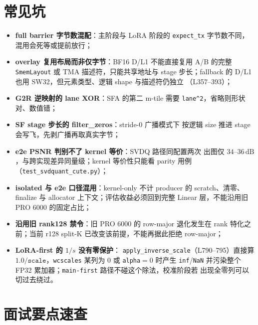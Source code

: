 \section{常见坑}

\begin{itemize}[itemsep=1pt,topsep=2pt]
  \item \textbf{full barrier 字节数混配}：主阶段与 LoRA 阶段的
        \texttt{expect\_tx} 字节数不同，混用会死等或提前放行；
  \item \textbf{overlay 复用布局而非仅字节}：BF16 D/L1 不能直接复用
        A/B 的完整 \texttt{SmemLayout} 或 TMA 描述符，只能共享地址与 stage
        步长；fallback 的 D/L1 也用 SW32，但元素类型、逻辑 shape 与描述符仍独立
        （L357--393）；
  \item \textbf{G2R 逆映射的 lane XOR}：SFA 的第二 m-tile 需要
        \texttt{lane\^{}2}，省略则形状对、数值错；
  \item \textbf{SF stage 步长的 filter\_zeros}：stride-0 广播模式下
        按逻辑 size 推进 stage 会写飞，先剥广播再取真实字节；
  \item \textbf{e2e PSNR 判别不了 kernel 等价}：SVDQ 路径同配置两次
        出图仅 $34$--$36\,\mathrm{dB}$，与跨实现差异同量级；kernel
        等价性只能看 parity 用例（\texttt{test\_svdquant\_cute.py}）；
  \item \textbf{isolated 与 e2e 口径混用}：kernel-only 不计 producer 的
        scratch、清零、finalize 与 allocator 上下文；评估收益必须回到完整
        Linear 层，不能沿用旧 PRO 6000 的固定占比；
  \item \textbf{沿用旧 rank128 禁令}：旧 PRO 6000 的 row-major 退化发生在
        rank 特化之前；当前 r128 split-K 已改变该前提，不能再据此拒绝
        row-major；
  \item \textbf{LoRA-first 的 $1/s$ 没有零保护}：
        \texttt{apply\_inverse\_scale}（L790--795）直接算
        $1.0/\texttt{scale}$，\texttt{wcscales} 某列为 0 或
        \texttt{alpha}$=0$ 时产生 \texttt{inf}/\texttt{NaN} 并污染整个
        FP32 累加器；\texttt{main-first} 路径不碰这个除法，校准阶段若
        出现全零列可以切过去绕过。
\end{itemize}

\section{面试要点速查}

